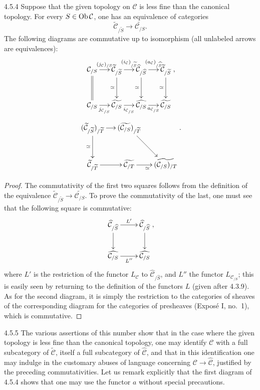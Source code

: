 \begin{corollary}{4.5.4}\label{IV.4.5.4}
Suppose that the given topology on \(\mathcal C\) is less fine
than the canonical topology. For every \(S\in\operatorname{Ob}\mathcal C\),
one has an equivalence of categories
\[
\widetilde{\mathcal C}_{/\widetilde S}
\longrightarrow\widetilde{\mathcal C_{/S}}.
\]
The following diagrams are commutative up to isomorphism
(all unlabeled arrows are equivalences):
\[
\xymatrix@C=1.4em@R=3em{
\mathcal C_{/S}\ar[r]^{(j_{\mathcal C})_{/S}}\ar@{=}[d]
 & \widetilde{\mathcal C}_{/\widetilde S}
\ar[r]^{(i_{\mathcal C})_{/\widetilde S}}\ar[d]_{\simeq}
 & \widehat{\mathcal C}_{/\widehat S}
\ar[r]^{(a_{\mathcal C})_{/\widehat S}}\ar[d]_{\simeq}
 & \widetilde{\mathcal C}_{/\widetilde S}\ar[d]_{\simeq}\\
\mathcal C_{/S}\ar[r]_{j_{\mathcal C_{/S}}}
 & \widetilde{\mathcal C_{/S}}\ar[r]_{i_{\mathcal C_{/S}}}
 & \widehat{\mathcal C_{/S}}\ar[r]_{a_{\mathcal C_{/S}}}
 & \widetilde{\mathcal C_{/S}} },
\]
\[
\xymatrix@C=1.3em@R=3em{
(\widetilde{\mathcal C}_{/\widetilde S})_{/\widetilde T}
\ar[r]\ar[d]_{\simeq}
 & (\widetilde{\mathcal C_{/S}})_{/\widetilde T}
\ar[dr] & \\
\widetilde{\mathcal C}_{/\widetilde T}
\ar[r] & \widetilde{\mathcal C_{/T}}\ar[r]_{\simeq}
 & \widetilde{(\mathcal C_{/S})_{/T}} }.
\]
\end{corollary}
\begin{proof}
The commutativity of the first two squares follows from the
definition of the equivalence
\(\widetilde{\mathcal C}_{/\widetilde S}
\to\widetilde{\mathcal C_{/S}}\).
To prove the commutativity of the last, one must see that
the following square is commutative:
\[
\xymatrix{
\widehat{\mathcal C}_{/\widehat S}\ar[r]^{L'}\ar[d]
 & \widehat{\mathcal C}_{/\widehat S}\ar[d]\\
\widehat{\mathcal C_{/S}}\ar[r]_{L''}
 & \widehat{\mathcal C_{/S}} },
\]
where \(L'\) is the restriction of the functor \(L_{\mathcal C}\)
to \(\widehat{\mathcal C}_{/\widehat S}\), and \(L''\) the
functor \(L_{\mathcal C_{/S}}\); this is easily seen by returning
to the definition of the functors \(L\) (given after 4.3.9).
As for the second diagram, it is simply the restriction to
the categories of sheaves of the corresponding diagram for
the categories of presheaves (Exposé I, no.\ 1), which is commutative.
\end{proof}

\begin{scholium}{4.5.5}\label{IV.4.5.5}
The various assertions of this number show that in the case
where the given topology is less fine than the canonical topology,
one may identify \(\mathcal C\) with a full subcategory of
\(\widetilde{\mathcal C}\), itself a full subcategory of
\(\widehat{\mathcal C}\), and that in this identification
one may indulge in the customary abuses of language concerning
\(\mathcal C\to\widehat{\mathcal C}\), justified by the preceding
commutativities. Let us remark explicitly that the first diagram
of 4.5.4 shows that one may use the functor \(a\) without special precautions.
\end{scholium}

